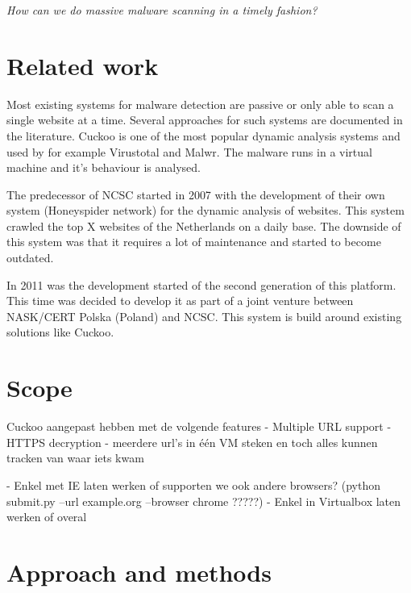 \documentclass{scrartcl}
\begin{document}
\textit{How can we do massive malware scanning in a timely fashion?}







\section{Related work}

Most existing systems for malware detection are passive or only able to scan a single website at a time. Several approaches for such systems are documented\cite{http://dl.acm.org.proxy.uba.uva.nl:2048/citation.cfm?doid=2089125.2089126} in the literature\cite{}. Cuckoo is one of the most popular dynamic analysis systems and used by for example Virustotal and Malwr. The malware runs in a virtual machine and it's behaviour is analysed.

The predecessor of NCSC started in 2007 with the development of their own system (Honeyspider network) for the dynamic analysis of websites. This system crawled the top X websites of the Netherlands on a daily base. The downside of this system was that it requires a lot of maintenance and started to become outdated.

In 2011 was the development started of the second generation of this platform. This time was decided to develop it as part of a joint venture between NASK/CERT Polska (Poland) and NCSC. This system is build around existing solutions like Cuckoo.

\section{Scope}

	Cuckoo aangepast hebben met de volgende features
		- Multiple URL support
		- HTTPS decryption
		- meerdere url's in één VM steken en toch alles kunnen tracken van waar iets kwam


 - Enkel met IE laten werken of supporten we ook andere browsers?
	(python submit.py --url example.org --browser chrome ?????)
 - Enkel in Virtualbox laten werken of overal


\section{Approach and methods}
\end{document}
